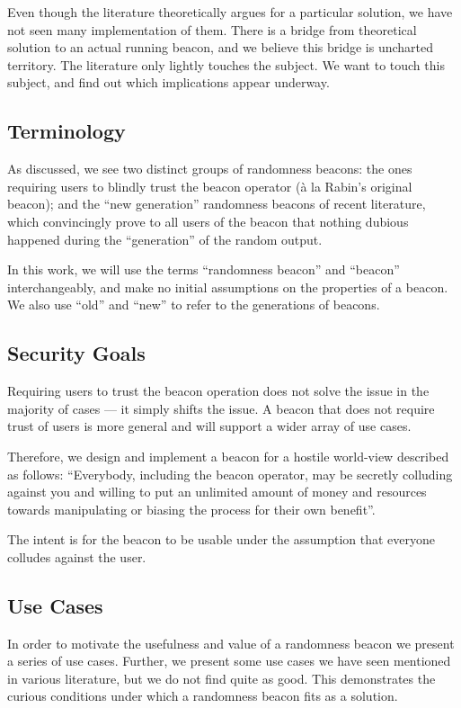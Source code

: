 Even though the literature theoretically argues for a particular solution, we have not seen many implementation of them. There is a bridge from theoretical solution to an actual running beacon, and we believe this bridge is uncharted territory. The literature only lightly touches the subject. We want to touch this subject, and find out which implications appear underway.

\subsection{Terminology}
As discussed, we see two distinct groups of randomness beacons: the ones requiring users to blindly trust the beacon operator (à la Rabin's original beacon); and the \enquote{new generation} randomness beacons of recent literature, which convincingly prove to all users of the beacon that nothing dubious happened during the \enquote{generation} of the random output.

In this work, we will use the terms \enquote{randomness beacon} and \enquote{beacon} interchangeably, and make no initial assumptions on the properties of a beacon. We also use \enquote{old} and \enquote{new} to refer to the generations of beacons. 

\subsection{Security Goals}\label{sec:security_goals}
Requiring users to trust the beacon operation does not solve the issue in the majority of cases --- it simply shifts the issue. A beacon that does not require trust of users is more general and will support a wider array of use cases.

Therefore, we design and implement a beacon for a hostile world-view described as follows:
\enquote{Everybody, including the beacon operator, may be secretly colluding against you and willing to put an unlimited amount of money and resources towards manipulating or biasing the process for their own benefit}.

The intent is for the beacon to be usable under the assumption that everyone colludes against the user.

\subsection{Use Cases}
In order to motivate the usefulness and value of a randomness beacon we present a series of use cases. Further, we present some use cases we have seen mentioned in various literature, but we do not find quite as good. This demonstrates the curious conditions under which a randomness beacon fits as a solution.

